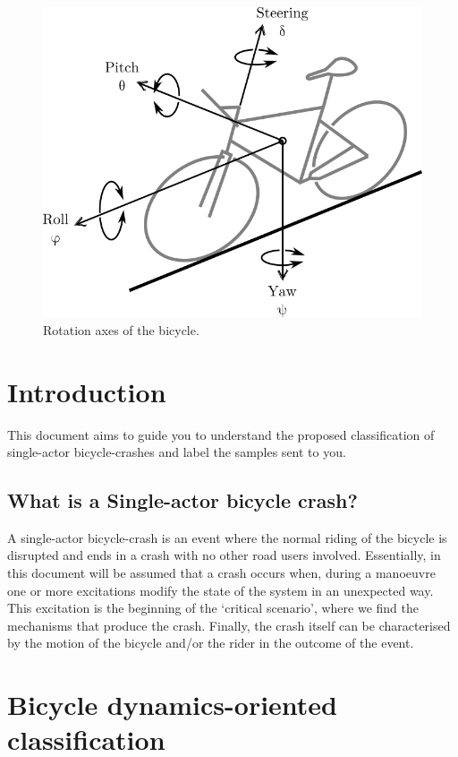 \documentclass{article}
\begin{document}
\begin{figure}[h]
    \centering
    \includegraphics[scale=1.0]{bike-dof.png}
    \caption{Rotation axes of the bicycle.}
    \label{fig: bike-dof}
\end{figure}


\section{Introduction}

This document aims to guide you to understand the proposed classification \cite{Jac04} of single-actor bicycle-crashes and label the samples sent to you.

\subsection{What is a Single-actor bicycle crash?}

A single-actor bicycle-crash is an event where the normal riding of the bicycle is disrupted and ends in a crash with no other road users involved.
%
Essentially, in this document will be assumed that a crash occurs when, during a manoeuvre one or more excitations modify the state of the system in an unexpected way.
%
This excitation is the beginning of the `critical scenario', where we find the mechanisms that produce the crash.
%
Finally, the crash itself can be characterised by the motion of the bicycle and/or the rider in the outcome of the event.

\section{Bicycle dynamics-oriented classification}
\end{document}
